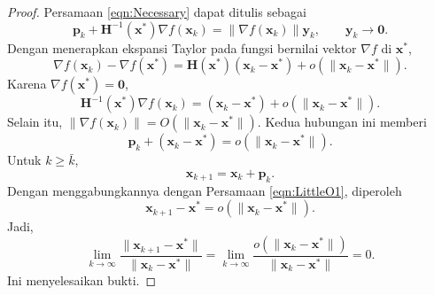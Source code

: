 \begin{proof}
Persamaan \ref{eqn:Necessary} dapat ditulis sebagai
\begin{equation}
\mathbf{p}_k+\mathbf{H}^{-1}(\mathbf{x}^*)\nabla f(\mathbf{x}_k)
=\lVert\nabla f(\mathbf{x}_k)\rVert\mathbf{y}_k,
\qquad\mathbf{y}_k\to\mathbf{0}.
\end{equation}
Dengan menerapkan ekspansi Taylor pada fungsi bernilai vektor $\nabla f$ di $\mathbf{x}^*$,
\begin{equation}
\nabla f(\mathbf{x}_k)-\nabla f(\mathbf{x}^*)
=\mathbf{H}(\mathbf{x}^*)(\mathbf{x}_k-\mathbf{x}^*)
+o\!\left(\lVert\mathbf{x}_k-\mathbf{x}^*\rVert\right).
\end{equation}
Karena $\nabla f(\mathbf{x}^*)=\mathbf{0}$,
\begin{equation}
\mathbf{H}^{-1}(\mathbf{x}^*)\nabla f(\mathbf{x}_k)
=(\mathbf{x}_k-\mathbf{x}^*)
+o\!\left(\lVert\mathbf{x}_k-\mathbf{x}^*\rVert\right).
\end{equation}
Selain itu, $\lVert\nabla f(\mathbf{x}_k)\rVert=O(\lVert\mathbf{x}_k-\mathbf{x}^*\rVert)$. Kedua hubungan ini memberi
\begin{equation}
\mathbf{p}_k+(\mathbf{x}_k-\mathbf{x}^*)
=o\!\left(\lVert\mathbf{x}_k-\mathbf{x}^*\rVert\right).
\label{eqn:LittleO1}
\end{equation}
Untuk $k\geq\bar{k}$,
\begin{equation}
\mathbf{x}_{k+1}=\mathbf{x}_k+\mathbf{p}_k.
\end{equation}
Dengan menggabungkannya dengan Persamaan \ref{eqn:LittleO1}, diperoleh
\begin{equation}
\mathbf{x}_{k+1}-\mathbf{x}^*
=o\!\left(\lVert\mathbf{x}_k-\mathbf{x}^*\rVert\right).
\end{equation}
Jadi,
\begin{equation}
\lim_{k\to\infty}
\frac{\lVert\mathbf{x}_{k+1}-\mathbf{x}^*\rVert}
{\lVert\mathbf{x}_k-\mathbf{x}^*\rVert}
=\lim_{k\to\infty}
\frac{o(\lVert\mathbf{x}_k-\mathbf{x}^*\rVert)}
{\lVert\mathbf{x}_k-\mathbf{x}^*\rVert}=0.
\end{equation}
Ini menyelesaikan bukti.
\end{proof}

